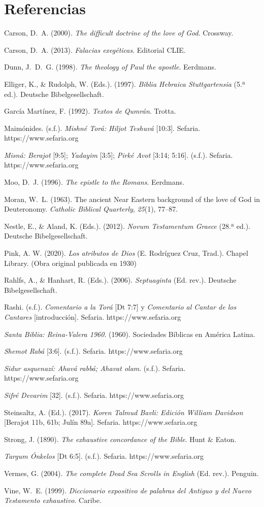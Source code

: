 \documentclass[11pt,letterpaper]{article}
\newcommand{\refapa}[1]{\par{\RaggedRight\hangindent=1.27cm\hangafter=1\noindent #1\par}\vspace{4pt}}
\begin{document}
\section*{Referencias}
\refapa{Carson, D.~A. (2000). \emph{The difficult doctrine of the love of God}. Crossway.}
\refapa{Carson, D.~A. (2013). \emph{Falacias exegéticas}. Editorial CLIE.}
\refapa{Dunn, J.~D.~G. (1998). \emph{The theology of Paul the apostle}. Eerdmans.}
\refapa{Elliger, K., \& Rudolph, W. (Eds.). (1997). \emph{Biblia Hebraica Stuttgartensia} (5.ª ed.). Deutsche Bibelgesellschaft.}
\refapa{García Martínez, F. (1992). \emph{Textos de Qumrán}. Trotta.}
\refapa{Maimónides. (s.f.). \emph{Mishné Torá: Hiljot Teshuvá} [10:3]. Sefaria. https://www.sefaria.org}
\refapa{\emph{Misná: Berajot} [9:5]; \emph{Yadayim} [3:5]; \emph{Pirké Avot} [3:14; 5:16]. (s.f.). Sefaria. https://www.sefaria.org}
\refapa{Moo, D.~J. (1996). \emph{The epistle to the Romans}. Eerdmans.}
\refapa{Moran, W.~L. (1963). The ancient Near Eastern background of the love of God in Deuteronomy. \emph{Catholic Biblical Quarterly}, \emph{25}(1), 77--87.}
\refapa{Nestle, E., \& Aland, K. (Eds.). (2012). \emph{Novum Testamentum Graece} (28.ª ed.). Deutsche Bibelgesellschaft.}
\refapa{Pink, A. W. (2020). \emph{Los atributos de Dios} (E. Rodríguez Cruz, Trad.). Chapel Library. (Obra original publicada en 1930)}
\refapa{Rahlfs, A., \& Hanhart, R. (Eds.). (2006). \emph{Septuaginta} (Ed. rev.). Deutsche Bibelgesellschaft.}
\refapa{Rashi. (s.f.). \emph{Comentario a la Torá} [Dt 7:7] y \emph{Comentario al Cantar de los Cantares} [introducción]. Sefaria. https://www.sefaria.org}
\refapa{\emph{Santa Biblia: Reina-Valera 1960}. (1960). Sociedades Bíblicas en América Latina.}
\refapa{\emph{Shemot Rabá} [3:6]. (s.f.). Sefaria. https://www.sefaria.org}
\refapa{\emph{Sidur asquenazí: Ahavá rabbá; Ahavat olam}. (s.f.). Sefaria. https://www.sefaria.org}
\refapa{\emph{Sifré Devarim} [32]. (s.f.). Sefaria. https://www.sefaria.org}
\refapa{Steinsaltz, A. (Ed.). (2017). \emph{Koren Talmud Bavli: Edición William Davidson} [Berajot 11b, 61b; Julín 89a]. Sefaria. https://www.sefaria.org}
\refapa{Strong, J. (1890). \emph{The exhaustive concordance of the Bible}. Hunt \& Eaton.}
\refapa{\emph{Targum Ónkelos} [Dt 6:5]. (s.f.). Sefaria. https://www.sefaria.org}
\refapa{Vermes, G. (2004). \emph{The complete Dead Sea Scrolls in English} (Ed. rev.). Penguin.}
\refapa{Vine, W.~E. (1999). \emph{Diccionario expositivo de palabras del Antiguo y del Nuevo Testamento exhaustivo}. Caribe.}
\end{document}
